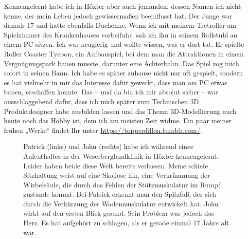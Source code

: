 \documentclass[fontsize=14pt,a4paper,headinclude,DIV=calc,automark]{scrbook}
\begin{document}
Kennengelernt habe ich in Höxter aber auch jemanden, dessen Namen ich nicht kenne, der mein Leben jedoch gewissermaßen beeinflusst hat. Der Junge war damals 17 und hatte ebenfalls Duchenne. Wenn ich mit meinem Tretroller am Spielzimmer des Krankenhauses vorbeifuhr, sah ich ihn in seinem Rollstuhl an einem PC sitzen. Ich war neugierig und wollte wissen, was er dort tat. Er spielte Roller Coaster Tycoon, ein Aufbauspiel, bei dem man die Attraktionen in einem Vergnügungspark bauen musste, darunter eine Achterbahn. Das Spiel zog mich sofort in seinen Bann. Ich habe es später zuhause nicht nur oft gespielt, sondern es hat vielmehr in mir das Interesse dafür geweckt, dass man am PC etwas bauen, erschaffen konnte. Das – und da bin ich mir absolut sicher – war ausschlaggebend dafür, dass ich mich später zum Technischen 3D Produktdesigner habe ausbilden lassen und das Thema 3D-Modellierung auch heute noch das Hobby ist, dem ich am meisten Zeit widme. Ein paar meiner frühen „Werke“ findet Ihr unter \url{https://topperdillon.tumblr.com/}.

\setlength{\fboxsep}{0pt}    %
\setlength{\fboxrule}{0.2pt} %
\begin{figure}[H]
    \centering
    \caption{Patrick (links) und John (rechts) habe ich während eines Aufenthaltes in der Weserberglandklinik in Höxter kennengelernt. Leider haben beide diese Welt bereits verlassen. Meine schiefe Sitzhaltung weist auf eine Skoliose hin, eine Verkrümmung der Wirbelsäule, die durch das Fehlen der Stützmuskulatur im Rumpf zustande kommt. Bei Patrick erkennt man den Spitzfuß, der sich durch die Verkürzung der Wadenmuskulatur entwickelt hat. John wirkt auf den ersten Blick gesund. Sein Problem war jedoch das Herz. Es hat aufgehört zu schlagen, als er gerade einmal 17 Jahre alt war.}
    \label{fig:patrick_john_und_ich}
\end{figure}
\end{document}
